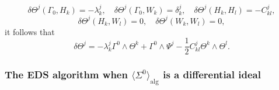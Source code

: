 \documentclass[11pt]{article}
\theoremstyle{plain}
\theoremstyle{definition}
\begin{document}
\begin{equation*}
    \delta \Theta^j(\Gamma_0,H_k)=-\lambda_k^j,\quad \delta \Theta^j(\Gamma_0,W_k)=\delta_k^j,\quad \delta\Theta^j(H_k,H_l)=-C_{kl}^j,
\end{equation*}
\begin{equation*}
    \delta \Theta^j(H_k,W_l)=0,\quad \delta \Theta^j(W_k,W_l)=0,
\end{equation*}
it follows that
\begin{equation}\label{eqn:dthetaj}
    \delta \Theta^j=-\lambda_k^j \Gamma^0\wedge \Theta^k+\Gamma^0\wedge \Psi^j-\frac{1}{2}C_{kl}^j \Theta^k\wedge \Theta^l.
\end{equation}

\subsubsection{\texorpdfstring{The EDS algorithm when $\langle \Sigma^0\rangle_{\mathrm{alg}}$ is a differential ideal}{The EDS algorithm when Sigma0 is a differential ideal}}
\end{document}

